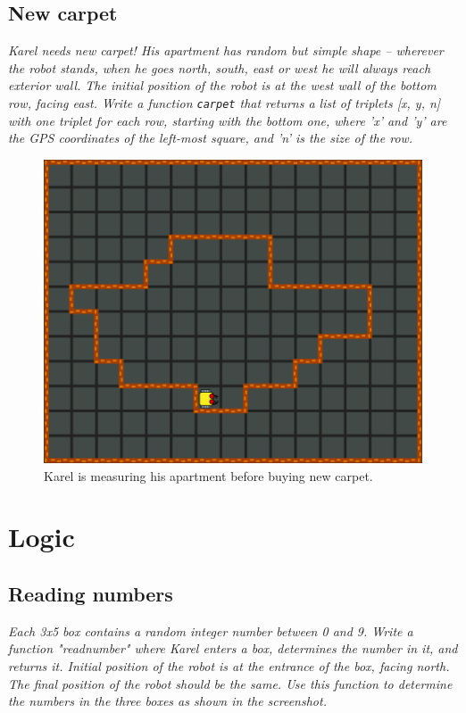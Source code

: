 {{\subsection{New carpet}

{\em Karel needs new carpet! His apartment has random but simple shape -- wherever 
the robot stands, when he goes north, south, east or west he will always reach exterior wall.
The initial position of the robot is at the west wall of the bottom row, facing east. 
Write a function {\tt carpet} that returns a list of triplets [x, y, n] with one triplet for each
row, starting with the bottom one, where 'x' and 'y' are the GPS coordinates of the left-most
square, and 'n' is the size of the row. }

\newpage

\begin{figure}[!ht]
\begin{center}
\includegraphics[height=0.4\textwidth]{img/h04.png}
\end{center}
\vspace{-4mm}
\caption{Karel is measuring his apartment before buying new carpet.}
\label{fig:h04}
\end{figure}


\section{Logic}

\subsection{Reading numbers}

{\em Each 3x5 box contains a random integer number between 0 and 9. Write a function "readnumber" 
where Karel enters a box, determines the number in it, and returns it. Initial position of the 
robot is at the entrance of the box, facing north. The final position of the robot should be the same. 
Use this function to determine the numbers in the three boxes as shown in the screenshot. }

}}
